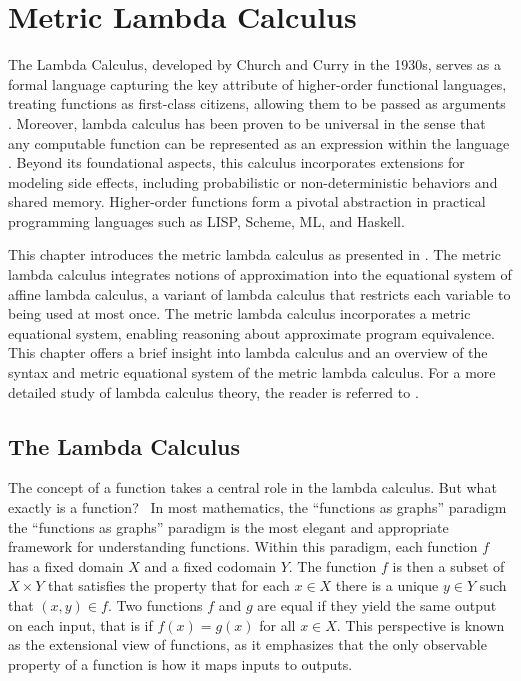 \chapter{Metric Lambda Calculus} \label{ch:metriclambda}

The Lambda Calculus, developed by Church and Curry in the 1930s, serves as a formal language capturing the key attribute of higher-order functional languages, treating functions as first-class citizens, allowing them to be passed as arguments \cite{barendregt1984lambda}.  Moreover, lambda calculus has been proven to be universal in the sense that any computable function can be represented as an expression within the language \cite{bernays1936alonzo} . Beyond its foundational aspects, this calculus incorporates extensions for modeling side effects, including probabilistic or non-deterministic behaviors and shared memory.  Higher-order functions form a pivotal abstraction in practical programming languages such as LISP, Scheme, ML, and Haskell.


This chapter introduces the metric lambda calculus as presented in \cite{dahlqvist2022syntactic}. The metric lambda calculus integrates notions of
approximation into the equational system of affine lambda calculus, a variant of lambda calculus that restricts each variable to being used at most once. The metric lambda calculus incorporates a metric equational system, enabling reasoning about approximate program equivalence. This chapter offers a brief insight into lambda calculus and an overview of the syntax and metric equational system of the metric lambda calculus. For a more detailed study of lambda calculus theory, the reader is referred to \cite{barendregt1984lambda}.


\section{The Lambda Calculus}

The concept of a function takes a central role in the lambda calculus. But what exactly is a function?  In most mathematics, the “functions as graphs” paradigm the “functions as graphs” paradigm is the most elegant and appropriate framework for understanding functions. Within this paradigm, each function $f$ has a fixed domain $X$ and a fixed codomain $Y$. The function $f$ is then a subset of $X \times Y$ that satisfies the property that for each $x \in X$ there is a unique $y \in Y$ such that $(x,y) \in f$. Two functions $f$ and $g$ are equal if they yield the same output on each input, that is if $f(x) = g(x)$ for all $x \in X$. This perspective is known as the extensional view of functions, as it emphasizes that the only observable property of a function is how it maps inputs to outputs.

